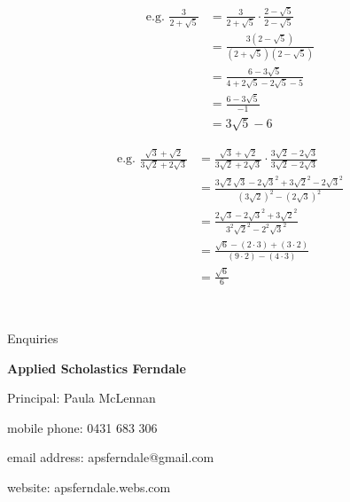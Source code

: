 \documentclass{article}
\begin{document}
\newpage

\begin{align*}
\text{e.g. }
\frac{3}{2+\sqrt{5}}
&=\frac{3}{2+\sqrt5}\cdot\frac{2-\sqrt{5}}{2-\sqrt{5}}\\
&=\frac{3(2-\sqrt{5})}{(2+\sqrt{5})(2-\sqrt{5})}\\
&=\frac{6-3\sqrt{5}}{4+2\sqrt{5}-2\sqrt{5}-5}\\
&=\frac{6-3\sqrt{5}}{-1}\\
&=3\sqrt{5}-6
\end{align*}

\newpage

\begin{align*}
\text{e.g. }
\frac{\sqrt{3}+\sqrt{2}}
{3\sqrt{2}+2\sqrt{3}}
&=\frac{\sqrt{3}+\sqrt{2}}
{3\sqrt{2}+2\sqrt{3}}\cdot
\frac{3\sqrt{2}-2\sqrt{3}}
{3\sqrt{2}-2\sqrt{3}}\\
&=\frac{3\sqrt{2}\sqrt{3}
-2{\sqrt{3}}^2
+3{\sqrt{2}}^2
-2{\sqrt{3}}^2}
{(3\sqrt{2})^2-(2\sqrt{3})^2}\\
&=\frac{2\sqrt{3}-2{\sqrt{3}}^2+3{\sqrt{2}}^2}
{3^2{\sqrt{2}}^2-2^2{\sqrt{3}}^2}\\
&=\frac{\sqrt{6}-(2\cdot3)+(3\cdot2)}{(9\cdot2)-(4\cdot3)}\\
&=\frac{\sqrt{6}}{6}
\end{align*}

\newpage
\
\newpage
\
\newpage
\
\newpage
\

\begin{center}
\doublespacing
\large

Enquiries

\textbf{Applied Scholastics Ferndale}

Principal: Paula McLennan

mobile phone: 0431 683 306

email address: apsferndale@gmail.com

website: apsferndale.webs.com
\end{center}
\end{document}
